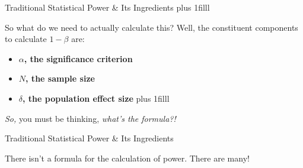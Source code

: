 \documentclass[
  ignorenonframetext,
  aspectratio=169,
]{beamer}
\providecommand{\tightlist}{%
  \setlength{\itemsep}{0pt}\setlength{\parskip}{0pt}}\usepackage{longtable,booktabs,array}
\begin{document}
\begin{frame}{Traditional Statistical Power \& Its Ingredients}
\label{traditional-statistical-power-its-ingredients}
\vskip0pt plus 1filll

So what do we need to actually calculate this? Well, the constituent
components to calculate \(1 - \beta\) are:

\begin{itemize}
\tightlist
\item
  \textbf{$\alpha$, the significance criterion}
\item
  \textbf{$N$, the sample size}
\item
  \textbf{$\delta$, the population effect size} \vskip0pt plus 1filll
\end{itemize}

\begin{center}
\textit{So,} you must be thinking, \textit{what's the formula?!}

\end{center}
\end{frame}

\begin{frame}{Traditional Statistical Power \& Its Ingredients}
\label{traditional-statistical-power-its-ingredients-1}
\begin{center}
\Large
There isn't a formula for the calculation of power. There are many!
\end{center}
\end{frame}
\end{document}
